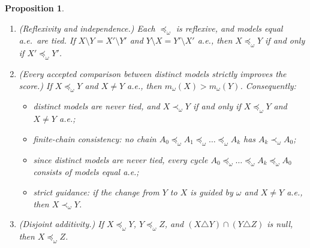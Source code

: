 \documentclass[11pt]{article}
\theoremstyle{plain}
\newtheorem{proposition}[theorem]{Proposition}
\theoremstyle{definition}
\theoremstyle{remark}
\begin{document}
\begin{proposition}\label{prop:structure}
\begin{enumerate}[label=(\alph*)]
  \item (Reflexivity and independence.) Each $\preceq_\omega$ is reflexive, and models
  equal a.e.\ are tied. If $X\setminus Y=X'\setminus Y'$ and $Y\setminus X=Y'\setminus X'$
  a.e., then $X\preceq_\omega Y$ if and only if $X'\preceq_\omega Y'$.
  \item (Every accepted comparison between distinct models strictly improves the score.)
  If $X\preceq_\omega Y$ and $X\ne Y$ a.e., then $m_\omega(X)>m_\omega(Y)$. Consequently:
  \begin{itemize}
    \item distinct models are never tied, and $X\prec_\omega Y$ if and only if $X\preceq_\omega
    Y$ and $X\ne Y$ a.e.;
    \item \emph{finite-chain consistency:} no chain $A_0\preceq_\omega A_1\preceq_\omega\dots
    \preceq_\omega A_k$ has $A_k\prec_\omega A_0$;
    \item since distinct models are never tied, every cycle $A_0\preceq_\omega\dots\preceq_\omega
    A_k\preceq_\omega A_0$ consists of models equal a.e.;
    \item \emph{strict guidance:} if the change from $Y$ to $X$ is guided by $\omega$ and $X\ne
    Y$ a.e., then $X\prec_\omega Y$.
  \end{itemize}
  \item (Disjoint additivity.) If $X\preceq_\omega Y$, $Y\preceq_\omega Z$, and $(X\triangle
  Y)\cap(Y\triangle Z)$ is null, then $X\preceq_\omega Z$.
\end{enumerate}
\end{proposition}
\end{document}
